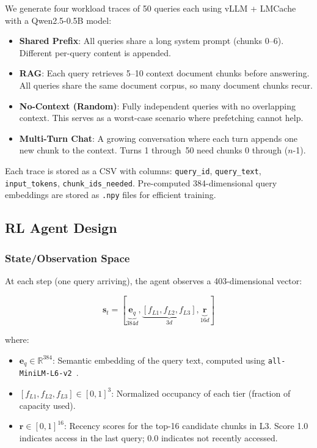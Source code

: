 \documentclass[conference]{IEEEtran}
\begin{document}
We generate four workload traces of 50 queries each using vLLM + LMCache with a Qwen2.5-0.5B model:

\begin{itemize}
    \item \textbf{Shared Prefix}: All queries share a long system prompt (chunks 0–6). Different per-query content is appended.
    \item \textbf{RAG}: Each query retrieves 5--10 context document chunks before answering. All queries share the same document corpus, so many document chunks recur.
    \item \textbf{No-Context (Random)}: Fully independent queries with no overlapping context. This serves as a worst-case scenario where prefetching cannot help.
    \item \textbf{Multi-Turn Chat}: A growing conversation where each turn appends one new chunk to the context. Turns 1 through~50 need chunks 0 through ($n$-1).
\end{itemize}

Each trace is stored as a CSV with columns: \texttt{query\_id}, \texttt{query\_text}, \texttt{input\_tokens}, \texttt{chunk\_ids\_needed}. Pre-computed 384-dimensional query embeddings are stored as \texttt{.npy} files for efficient training.

\subsection{RL Agent Design}

\subsubsection{State/Observation Space}

At each step (one query arriving), the agent observes a 403-dimensional vector:

\begin{equation}
\mathbf{s}_t = [\underbrace{\mathbf{e}_q}_{384d}, \underbrace{[f_{L1}, f_{L2}, f_{L3}]}_{3d}, \underbrace{\mathbf{r}}_{16d}]
\end{equation}

where:
\begin{itemize}
    \item $\mathbf{e}_q \in \mathbb{R}^{384}$: Semantic embedding of the query text, computed using \texttt{all-MiniLM-L6-v2}~\cite{reimers2019sentencebert}.
    \item $[f_{L1}, f_{L2}, f_{L3}] \in [0,1]^3$: Normalized occupancy of each tier (fraction of capacity used).
    \item $\mathbf{r} \in [0,1]^{16}$: Recency scores for the top-16 candidate chunks in L3. Score 1.0 indicates access in the last query; 0.0 indicates not recently accessed.
\end{itemize}
\end{document}
